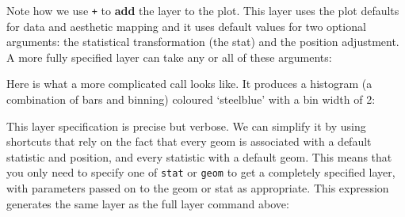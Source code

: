 \begin{Shaded}
\begin{Highlighting}[]
\StringTok{ }\StringTok{ }\NormalTok{(} \NormalTok{)}
\end{Highlighting}
\end{Shaded}

\noindent Note how we use \texttt{+} to \textbf{add} the layer to the
plot.  \indexc{+} This layer uses the plot defaults
for data and aesthetic mapping and it uses default values for two
optional arguments: the statistical transformation (the stat) and the
position adjustment. A more fully specified layer can take any or all of
these arguments:

\begin{Shaded}
\begin{Highlighting}[]
\end{Highlighting}
\end{Shaded}

\noindent Here is what a more complicated call looks like. It produces a
histogram (a combination of bars and binning) coloured `steelblue' with
a bin width of 2:

\begin{Shaded}
\begin{Highlighting}[]
\StringTok{ }\NormalTok{(} 
\StringTok{ }\StringTok{ }\NormalTok{(}
   \NormalTok{, }
   \NormalTok{(} \NormalTok{),}
   \NormalTok{,}
   \NormalTok{(} \NormalTok{)}
\NormalTok{)}
\end{Highlighting}
\end{Shaded}

\noindent  This layer specification is precise but verbose. We can
simplify it by using shortcuts that rely on the fact that every geom is
associated with a default statistic and position, and every statistic
with a default geom. This means that you only need to specify one of
\texttt{stat} or \texttt{geom} to get a completely specified layer, with
parameters passed on to the geom or stat as appropriate. This expression
generates the same layer as the full layer command above:

